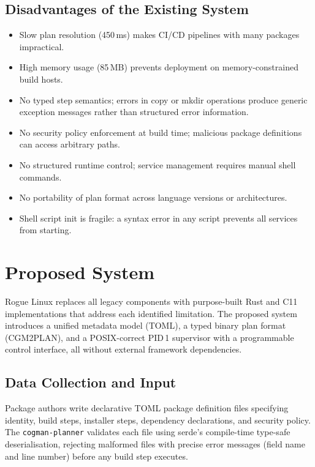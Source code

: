\documentclass[12pt,a4paper]{report}
\begin{document}
\subsection{Disadvantages of the Existing System}
\begin{itemize}[leftmargin=2em, itemsep=2pt]
  \item Slow plan resolution (450\,ms) makes CI/CD pipelines with many packages
        impractical.
  \item High memory usage (85\,MB) prevents deployment on memory-constrained
        build hosts.
  \item No typed step semantics; errors in copy or mkdir operations produce
        generic exception messages rather than structured error information.
  \item No security policy enforcement at build time; malicious package
        definitions can access arbitrary paths.
  \item No structured runtime control; service management requires manual shell
        commands.
  \item No portability of plan format across language versions or architectures.
  \item Shell script init is fragile: a syntax error in any script prevents all
        services from starting.
\end{itemize}

\section{Proposed System}

Rogue Linux replaces all legacy components with purpose-built Rust and C11
implementations that address each identified limitation. The proposed system
introduces a unified metadata model (TOML), a typed binary plan format (CGM2PLAN),
and a POSIX-correct PID\,1 supervisor with a programmable control interface, all
without external framework dependencies.

\subsection{Data Collection and Input}
Package authors write declarative TOML package definition files specifying
identity, build steps, installer steps, dependency declarations, and security
policy. The \texttt{cogman-planner} validates each file using serde's compile-time
type-safe deserialisation, rejecting malformed files with precise error messages
(field name and line number) before any build step executes.
\end{document}
